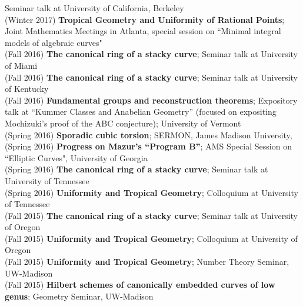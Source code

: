 \documentclass[margin,line]{res}
\begin{document}
\begin{resume}
Seminar talk at University of California, Berkeley
\vspace{.05cm}\\
(Winter 2017) \textbf{Tropical Geometry and Uniformity of Rational Points};
Joint Mathematics Meetings in Atlanta, special session on ``Minimal integral models of algebraic curves"  
\vspace{.05cm}\\
(Fall 2016) \textbf{The canonical ring of a stacky curve};  
Seminar talk at University of Miami
\vspace{.05cm}\\
(Fall 2016) \textbf{The canonical ring of a stacky curve};  
Seminar talk at University of Kentucky
\vspace{.05cm}\\
(Fall 2016) \textbf{Fundamental groups and reconstruction theorems}; Expository talk at ``Kummer Classes and Anabelian Geometry'' (focused on expositing Mochizuki's proof of the ABC conjecture); University of Vermont  
\vspace{.05cm}\\
(Spring 2016) \textbf{Sporadic cubic torsion};  
SERMON, James Madison University, 
\vspace{.05cm}\\
(Spring 2016) \textbf{Progress on Mazur's ``Program B''};  
AMS Special Session on  ``Elliptic Curves", University of Georgia
\vspace{.05cm}\\
(Spring 2016) \textbf{The canonical ring of a stacky curve};  
Seminar talk at University of Tennessee
\vspace{.05cm}\\
(Spring 2016) \textbf{Uniformity and Tropical Geometry};
Colloquium at University of Tennessee
\vspace{.05cm}\\
(Fall 2015) \textbf{The canonical ring of a stacky curve};  
Seminar talk at University of Oregon
\vspace{.05cm}\\
(Fall 2015) \textbf{Uniformity and Tropical Geometry};
Colloquium at University of Oregon
\vspace{.05cm}\\
(Fall 2015) \textbf{Uniformity and Tropical Geometry};
Number Theory Seminar, UW-Madison
\vspace{.05cm}\\
(Fall 2015) \textbf{Hilbert schemes of canonically embedded curves of low genus};
Geometry Seminar, UW-Madison

\end{resume}
\end{document}
